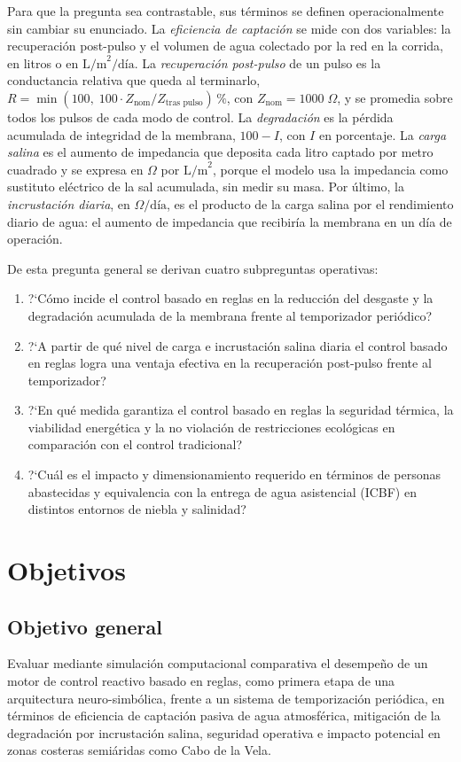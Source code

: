 Para que la pregunta sea contrastable, sus t\'erminos se definen operacionalmente sin cambiar su enunciado. La \emph{eficiencia de captaci\'on} se mide con dos variables: la recuperaci\'on post-pulso y el volumen de agua colectado por la red en la corrida, en litros o en $\text{L/m}^2\text{/d\'ia}$. La \emph{recuperaci\'on post-pulso} de un pulso es la conductancia relativa que queda al terminarlo, $R = \min\left(100,\; 100\cdot Z_{\text{nom}}/Z_{\text{tras pulso}}\right)\,\%$, con $Z_{\text{nom}} = 1000\;\Omega$, y se promedia sobre todos los pulsos de cada modo de control. La \emph{degradaci\'on} es la p\'erdida acumulada de integridad de la membrana, $100 - I$, con $I$ en porcentaje. La \emph{carga salina} es el aumento de impedancia que deposita cada litro captado por metro cuadrado y se expresa en $\Omega$ por $\text{L/m}^2$, porque el modelo usa la impedancia como sustituto el\'ectrico de la sal acumulada, sin medir su masa. Por \'ultimo, la \emph{incrustaci\'on diaria}, en $\Omega\text{/d\'ia}$, es el producto de la carga salina por el rendimiento diario de agua: el aumento de impedancia que recibir\'ia la membrana en un d\'ia de operaci\'on.

De esta pregunta general se derivan cuatro subpreguntas operativas:
\begin{enumerate}[label=\alph*)]
  \item ?`C\'omo incide el control basado en reglas en la reducci\'on del desgaste y la degradaci\'on acumulada de la membrana frente al temporizador peri\'odico?
  \item ?`A partir de qu\'e nivel de carga e incrustaci\'on salina diaria el control basado en reglas logra una ventaja efectiva en la recuperaci\'on post-pulso frente al temporizador?
  \item ?`En qu\'e medida garantiza el control basado en reglas la seguridad t\'ermica, la viabilidad energ\'etica y la no violaci\'on de restricciones ecol\'ogicas en comparaci\'on con el control tradicional?
  \item ?`Cu\'al es el impacto y dimensionamiento requerido en t\'erminos de personas abastecidas y equivalencia con la entrega de agua asistencial (ICBF) en distintos entornos de niebla y salinidad?
\end{enumerate}

\section{Objetivos}

\subsection{Objetivo general}
Evaluar mediante simulaci\'on computacional comparativa el desempe\~no de un motor de control reactivo basado en reglas, como primera etapa de una arquitectura neuro-simb\'olica, frente a un sistema de temporizaci\'on peri\'odica, en t\'erminos de eficiencia de captaci\'on pasiva de agua atmosf\'erica, mitigaci\'on de la degradaci\'on por incrustaci\'on salina, seguridad operativa e impacto potencial en zonas costeras semi\'aridas como Cabo de la Vela.

